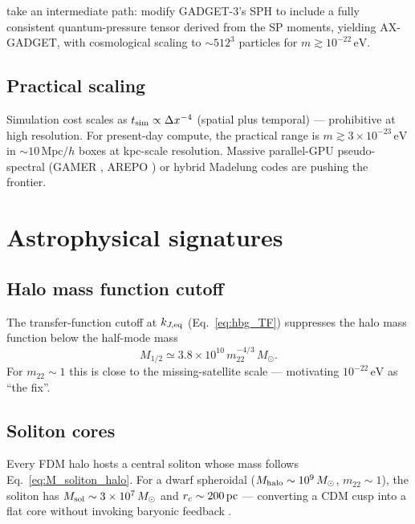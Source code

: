 \documentclass[12pt]{article}
\newcommand{\eV}{\,\mathrm{eV}}
\newcommand{\Mpc}{\,\mathrm{Mpc}}
\newcommand{\Msun}{\,M_\odot}
\newcommand{\mtwtwo}{m_{22}}
\begin{document}
\citet{NoriBaldi2018} take an intermediate path: modify GADGET-3's
SPH to include a fully consistent quantum-pressure tensor derived
from the SP moments, yielding AX-GADGET, with cosmological scaling to
$\sim 512^3$ particles for $m\gtrsim 10^{-22}\eV$.

\subsection{Practical scaling}

Simulation cost scales as $t_{\rm sim}\propto \Delta x^{-4}$ (spatial
plus temporal) --- prohibitive at high resolution.  For present-day
compute, the practical range is
$m\gtrsim 3\times 10^{-23}\eV$ in $\sim 10\Mpc/h$ boxes at kpc-scale
resolution.  Massive parallel-GPU pseudo-spectral (GAMER
\citep{Schive2014}, AREPO \citep{MaySpringel2021}) or hybrid Madelung
codes are pushing the frontier.

\section{Astrophysical signatures}
\label{sec:signatures}

\subsection{Halo mass function cutoff}

The transfer-function cutoff at $k_{J,{\rm eq}}$
(Eq.~\ref{eq:hbg_TF}) suppresses the halo mass function below the
half-mode mass
%
\begin{equation}
  M_{1/2} \simeq 3.8\times 10^{10}\,\mtwtwo^{-4/3}\Msun.
\end{equation}
%
For $\mtwtwo\sim 1$ this is close to the missing-satellite scale ---
motivating $10^{-22}\eV$ as ``the fix''.

\subsection{Soliton cores}

Every FDM halo hosts a central soliton whose mass follows
Eq.~\eqref{eq:M_soliton_halo}.  For a dwarf spheroidal
($M_{\rm halo}\sim 10^9\Msun$, $\mtwtwo\sim 1$), the soliton has
$M_{\rm sol}\sim 3\times 10^7\Msun$ and $r_c\sim 200\,{\rm pc}$ ---
converting a CDM cusp into a flat core without invoking baryonic
feedback \citep{Schive2014}.
\end{document}
